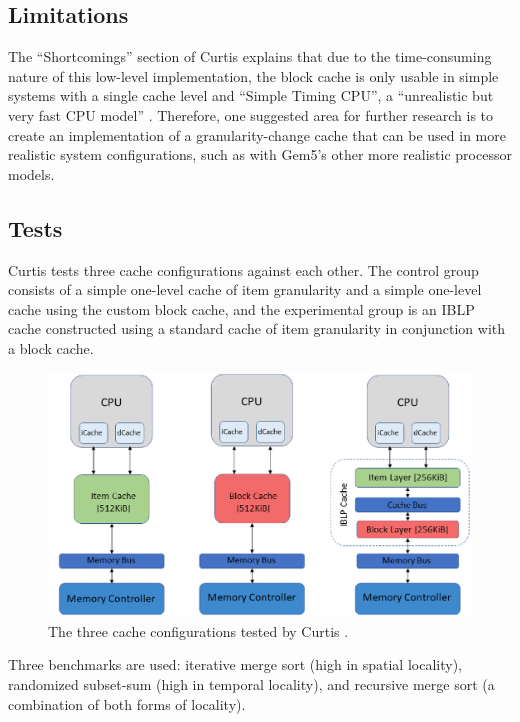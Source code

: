 \documentclass[12pt,twoside]{reedthesis}
\begin{document}
	\subsection*{Limitations}

	The ``Shortcomings'' section of Curtis explains that due to the time-consuming nature of this low-level implementation, the block cache is only usable in simple systems with a single cache level and ``Simple Timing CPU'', a ``unrealistic but very fast CPU model'' \cite{curtis}. Therefore, one suggested area for further research is to create an implementation of a granularity-change cache that can be used in more realistic system configurations, such as with Gem5's other more realistic processor models.

	\subsection*{Tests}

	Curtis tests three cache configurations against each other. The control group consists of a simple one-level cache of item granularity and a simple one-level cache using the custom block cache, and the experimental group is an IBLP cache constructed using a standard cache of item granularity in conjunction with a block cache.
	
	\begin{figure}[H]
		\centering
		\includegraphics[width=5in]{figures/curtis_caches.png}
		\caption{The three cache configurations tested by Curtis \cite{curtis}.}
	\end{figure}

	Three benchmarks are used: iterative merge sort (high in spatial locality), randomized subset-sum (high in temporal locality), and recursive merge sort (a combination of both forms of locality).
	
\end{document}
